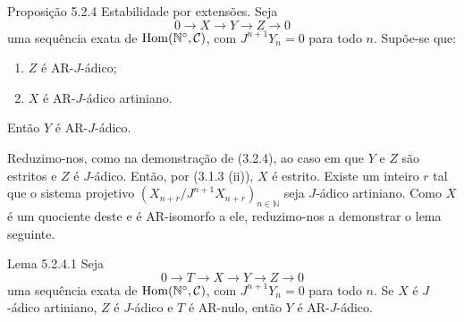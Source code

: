 \begin{statement}{Proposição 5.2.4}
Estabilidade por extensões. Seja
\[
0\longrightarrow X\longrightarrow Y\longrightarrow Z\longrightarrow0
\]
uma sequência exata de \(\operatorname{Hom}(\mathbb N^\circ,\mathcal C)\), com \(J^{n+1}Y_n=0\) para todo \(n\). Supõe-se que:
\begin{enumerate}[label=\textup{(\roman*)}]
\item \(Z\) é AR-\(J\)-ádico;
\item \(X\) é AR-\(J\)-ádico artiniano.
\end{enumerate}
Então \(Y\) é AR-\(J\)-ádico.
\end{statement}

\begin{prooftext}
Reduzimo-nos, como na demonstração de (3.2.4), ao caso em que \(Y\) e \(Z\) são estritos e \(Z\) é \(J\)-ádico. Então, por (3.1.3 (ii)), \(X\) é estrito. Existe um inteiro \(r\) tal que o sistema projetivo \((X_{n+r}/J^{n+1}X_{n+r})_{n\in\mathbb N}\) seja \(J\)-ádico artiniano. Como \(X\) é um quociente deste e é AR-isomorfo a ele, reduzimo-nos a demonstrar o lema seguinte.
\end{prooftext}

\begin{statement}{Lema 5.2.4.1}
Seja
\[
0\longrightarrow T\longrightarrow X\longrightarrow Y\longrightarrow Z\longrightarrow0
\]
uma sequência exata de \(\operatorname{Hom}(\mathbb N^\circ,\mathcal C)\), com \(J^{n+1}Y_n=0\) para todo \(n\). Se \(X\) é \(J\)-ádico artiniano, \(Z\) é \(J\)-ádico e \(T\) é AR-nulo, então \(Y\) é AR-\(J\)-ádico.
\end{statement}

